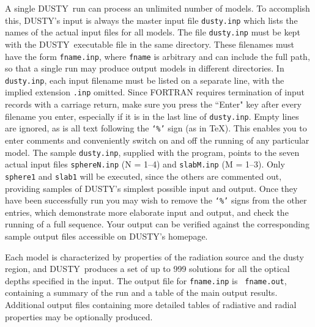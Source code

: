 \documentclass[11pt]{article}
\def\D  {{\sf DUSTY}}
\begin{document}
A single \D\ run can process an unlimited number of models.  To accomplish
this, \D's input is always the master input file {\tt dusty.inp} which lists 
the names of the actual input files for all models. The file {\tt dusty.inp} 
must be kept with the \D\ executable file in the same directory. These
filenames must have the form {\tt fname.inp}, where {\tt fname} is arbitrary
and can include the full path, so that a single run may produce output models in
different directories. In {\tt dusty.inp}, each input filename must be listed
on a separate line, with the implied extension {\tt .inp} omitted. Since
FORTRAN requires termination of input records with a carriage return, make sure
you press the ``Enter" key after every filename you enter, especially if it is
in the last line of {\tt dusty.inp}. Empty lines are ignored, as is all text
following the {\tt `\%'} sign (as in \TeX).  This enables you to enter comments
and conveniently switch on and off the running of any particular model.  The
sample {\tt dusty.inp}, supplied with the program, points to the seven actual
input files {\tt sphereN.inp} (N = 1--4) and {\tt slabM.inp} (M = 1--3). Only
{\tt sphere1} and {\tt slab1} will be executed, since the others are commented
out, providing samples of \D's simplest possible input and output. Once they
have been successfully run you may wish to remove the {\tt `\%'} signs from the
other entries, which demonstrate more elaborate input and output, and check the
running of a full sequence. Your output can be verified against the
corresponding sample output files accessible on \D's homepage.

Each model is characterized by properties of the radiation source and the dusty
region, and \D\ produces a set of up to 999 solutions for all the optical
depths specified in the input.  The output file for {\tt fname.inp} is {\tt
fname.out}, containing a summary of the run and a table of the main output
results. Additional output files containing more detailed tables of radiative
and radial properties may be optionally produced.
\end{document}
